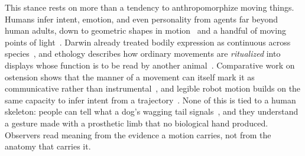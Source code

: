 \documentclass[letterpaper,10pt,conference]{ieeeconf}
\begin{document}
This stance rests on more than a tendency to anthropomorphize moving things. Humans infer intent, emotion, and even personality from agents far beyond human adults, down to geometric shapes in motion~\cite{heider1944apparent} and a handful of moving points of light~\cite{johansson1973biological}. Darwin already treated bodily expression as continuous across species~\cite{darwin1872expression}, and ethology describes how ordinary movements are \emph{ritualized} into displays whose function is to be read by another animal~\cite{tinbergen1952derived,maynardsmith2003signals}. Comparative work on ostension shows that the manner of a movement can itself mark it as communicative rather than instrumental~\cite{tomasello2008origins,moore2016meaning}, and legible robot motion builds on the same capacity to infer intent from a trajectory~\cite{dragan2013legibility}. None of this is tied to a human skeleton: people can tell what a dog's wagging tail signals~\cite{quaranta2007tail}, and they understand a gesture made with a prosthetic limb that no biological hand produced. Observers read meaning from the evidence a motion carries, not from the anatomy that carries it.
\end{document}
